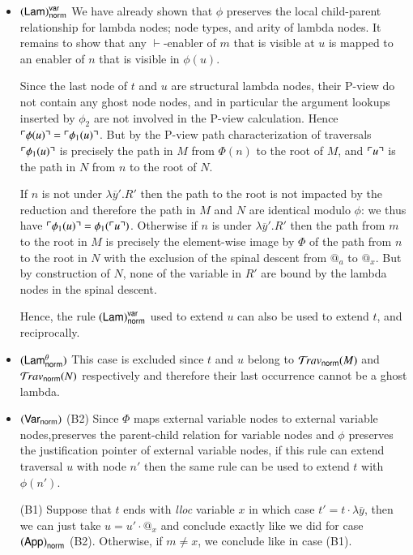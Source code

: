 \documentclass{elsarticle}
\theoremstyle{plain}
\theoremstyle{definition}
\newcommand{\ghostvar}{\theta}
\newcommand{\normalizing}{{\sf norm}}
\newcommand{\travsetnorm}{\travset_\normalizing} %
\newcommand{\enables}{\vdash} %
\begin{document}
\begin{itemize}[itemindent=0.5em, leftmargin=0.5em]
    \item $\rulename{Lam}^{\sf var}_\normalizing$
    We have already shown that  $\phi$ preserves the local child-parent relationship for lambda nodes; node types, and arity of lambda nodes.
    It remains to show that any $\enables$-enabler of $m$ that is visible at  $u$ is mapped to an enabler of $n$ that is visible in $\phi(u)$.

    Since the last node of $t$ and $u$ are structural lambda nodes, their P-view do not contain any ghost node nodes, and in particular the argument lookups inserted by $\phi_2$ are not involved in the P-view calculation. Hence $\ulcorner \phi(u) \urcorner = \ulcorner \phi_1(u) \urcorner$.
    But by the P-view path characterization of traversals $\ulcorner \phi_1(u) \urcorner$ is precisely the path in $M$ from $\Phi(n)$ to the root of $M$,
    and $\ulcorner u \urcorner$ is the path in $N$ from $n$ to the root of $N$.

    If $n$ is not under $\lambda\overline{y}'.R'$ then the path to the root is not impacted by the reduction and therefore the path in $M$ and $N$ are identical modulo $\phi$: we thus have $\ulcorner \phi_1(u) \urcorner = \phi_1(\ulcorner u \urcorner)$.
    Otherwise if $n$ is under $\lambda\overline{y}'.R'$ then the path from $m$ to the root in $M$ is precisely the element-wise image by $\Phi$ of the path from $n$ to the root in $N$ with the exclusion of the spinal descent from $@_a$ to $@_x$. But by construction of $N$, none of the variable in $R'$ are bound by the lambda nodes in the spinal descent.

    Hence, the rule $\rulename{Lam}^{\sf var}_\normalizing$ used to extend  $u$ can also be used to extend $t$, and reciprocally.

    \item $\rulename{Lam^\ghostvar_\normalizing}$
    This case is excluded since $t$ and $u$ belong to $\travsetnorm(M)$ and
    $\travsetnorm(N)$ respectively and therefore their last occurrence cannot be a ghost lambda.

    \item $\rulename{Var_\normalizing}$
    (B2) Since $\Phi$ maps external variable nodes to external variable nodes,preserves the parent-child relation for variable nodes and $\phi$ preserves the justification pointer of external variable nodes, if this rule can extend traversal $u$ with node $n'$ then the same rule can be used to extend $t$ with $\phi(n')$.

    (B1) Suppose that $t$ ends with \emph{lloc} variable $x$ in which case $t' = t \cdot \lambda\overline{y}$, then
        we can just take $u = u' \cdot @_x$ and conclude exactly like we did for case $\rulename{App}_\normalizing$ (B2).
    Otherwise, if $m\neq x$, we conclude like in case (B1).


\end{itemize}
\end{document}
